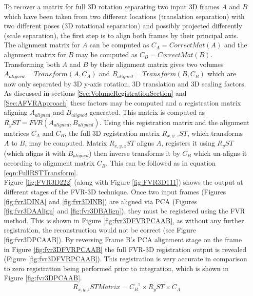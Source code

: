 To recover a matrix for full 3D rotation separating two input 3D frames $A$ and $B$ which have been taken from two different locations (translation separation) with two different poses (3D rotational separation) and possibly projected differently (scale separation), the first step is to align both frames by their principal axis. The alignment matrix for $A$ can be computed as $C_A = CorrectMat(A)$ and the alignment matrix for $B$ may be computed as $C_B = CorrectMat(B)$. Transforming both $A$ and $B$ by their alignment matrix gives two volumes $A_{aligned} = Transform(A, C_A)$ and $B_{aligned} = Transform(B, C_B)$ which are now only separated by 3D y-axis rotation, 3D translation and 3D scaling factors. As discussed in sections \ref{Sec:VolumeRegistrationSection} and \ref{Sec:AFVRApproach} these factors may be computed and a registration matrix aligning $A_{aligned}$ and $B_{aligned}$ generated. This matrix is computed as $R_{y}ST = FVR(A_{aligned},B_{aligned})$. Using this registration matrix and the alignment matrices $C_{A}$ and $C_{B}$, the full 3D registration matrix $R_{x,y,z}ST$, which transforms $A$ to $B$, may be computed. Matrix $R_{x,y,z}ST$ aligns $A$, registers it using $R_{y}ST$ (which aligns it with $B_{aligned}$) then inverse transforms it by $C_{B}$ which un-aligns it according to alignment matrix $C_B$. This can be followed as in equation \ref{eqn:FullRSTTransform}. \\


Figure \ref{fig:FVR3D222} (along with Figure \ref{fig:FVR3D111}) shows the output at different stages of the FVR-3D technique. Once two input frames (Figures \ref{fig:fvr3DINA} and \ref{fig:fvr3DINB}) are aligned via PCA (Figures \ref{fig:fvr3DAAlign} and \ref{fig:fvr3DBAlign}), they must be registered using the FVR method. This is shown in Figure \ref{fig:fvr3DFVRPCAAB}, as without any further registration, the reconstruction would not be correct (see Figure \ref{fig:fvr3DPCAAB}). By reversing Frame B's PCA alignment stage on the frame in Figure \ref{fig:fvr3DFVRPCAAB} the full FVR-3D registration output is revealed (Figure \ref{fig:fvr3DFVRPCAAB}). This registration is very accurate in comparison to zero registration being performed prior to integration, which is shown in Figure \ref{fig:fvr3DPCAAB}. \\
 

\begin{equation} \label{eqn:FullRSTTransform}
R_{x,y,z}ST Matrix = C_{B}^{-1} \times R_{y}ST \times C_A
\end{equation}

